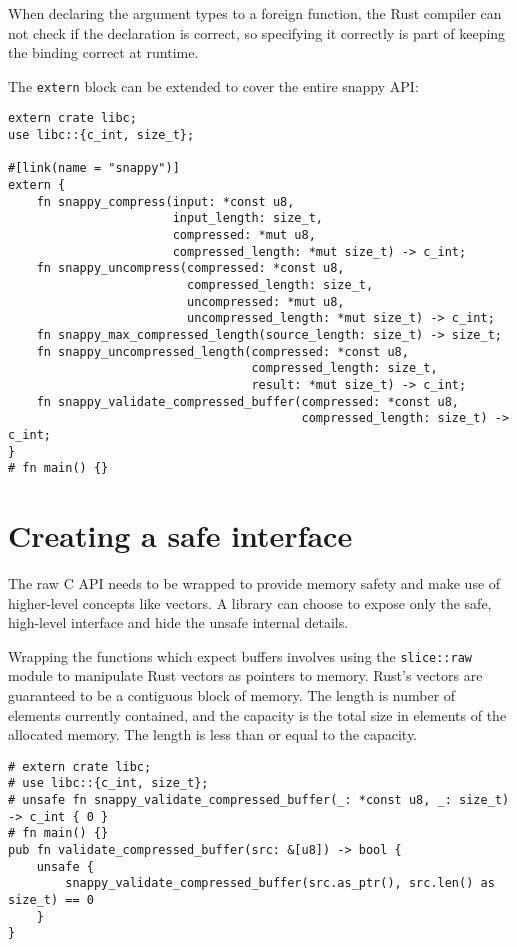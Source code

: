 \documentclass[]{article}
\begin{document}
When declaring the argument types to a foreign function, the Rust
compiler can not check if the declaration is correct, so specifying it
correctly is part of keeping the binding correct at runtime.

The \texttt{extern} block can be extended to cover the entire snappy
API:

\begin{verbatim}
extern crate libc;
use libc::{c_int, size_t};

#[link(name = "snappy")]
extern {
    fn snappy_compress(input: *const u8,
                       input_length: size_t,
                       compressed: *mut u8,
                       compressed_length: *mut size_t) -> c_int;
    fn snappy_uncompress(compressed: *const u8,
                         compressed_length: size_t,
                         uncompressed: *mut u8,
                         uncompressed_length: *mut size_t) -> c_int;
    fn snappy_max_compressed_length(source_length: size_t) -> size_t;
    fn snappy_uncompressed_length(compressed: *const u8,
                                  compressed_length: size_t,
                                  result: *mut size_t) -> c_int;
    fn snappy_validate_compressed_buffer(compressed: *const u8,
                                         compressed_length: size_t) -> c_int;
}
# fn main() {}
\end{verbatim}

\section{Creating a safe interface}\label{creating-a-safe-interface}

The raw C API needs to be wrapped to provide memory safety and make use
of higher-level concepts like vectors. A library can choose to expose
only the safe, high-level interface and hide the unsafe internal
details.

Wrapping the functions which expect buffers involves using the
\texttt{slice::raw} module to manipulate Rust vectors as pointers to
memory. Rust's vectors are guaranteed to be a contiguous block of
memory. The length is number of elements currently contained, and the
capacity is the total size in elements of the allocated memory. The
length is less than or equal to the capacity.

\begin{verbatim}
# extern crate libc;
# use libc::{c_int, size_t};
# unsafe fn snappy_validate_compressed_buffer(_: *const u8, _: size_t) -> c_int { 0 }
# fn main() {}
pub fn validate_compressed_buffer(src: &[u8]) -> bool {
    unsafe {
        snappy_validate_compressed_buffer(src.as_ptr(), src.len() as size_t) == 0
    }
}
\end{verbatim}
\end{document}
